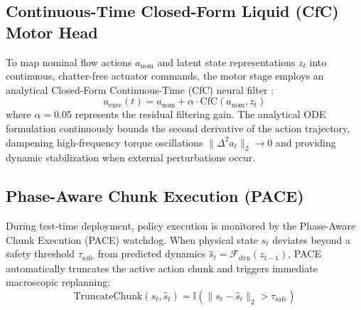 \documentclass{article}
\begin{document}
\subsection{Continuous-Time Closed-Form Liquid (CfC) Motor Head}
To map nominal flow actions $a_{\text{nom}}$ and latent state representations $z_t$ into continuous, chatter-free actuator commands, the motor stage employs an analytical Closed-Form Continuous-Time (CfC) neural filter \cite{hasani2022closed}:
\begin{equation}
    a_{\text{exec}}(t) = a_{\text{nom}} + \alpha \cdot \text{CfC}(a_{\text{nom}}, z_t)
\end{equation}
where $\alpha = 0.05$ represents the residual filtering gain. The analytical ODE formulation continuously bounds the second derivative of the action trajectory, dampening high-frequency torque oscillations $\|\Delta^2 a_t\|_2 \to 0$ and providing dynamic stabilization when external perturbations occur.

\subsection{Phase-Aware Chunk Execution (PACE)}
During test-time deployment, policy execution is monitored by the Phase-Aware Chunk Execution (PACE) watchdog. When physical state $s_t$ deviates beyond a safety threshold $\tau_{\text{safe}}$ from predicted dynamics $\hat{s}_t = \mathcal{F}_{\text{dyn}}(z_{t-1})$, PACE automatically truncates the active action chunk and triggers immediate macroscopic replanning:
\begin{equation}
    \text{TruncateChunk}(s_t, \hat{s}_t) = \mathbb{I}\left( \|s_t - \hat{s}_t\|_2 > \tau_{\text{safe}} \right)
\end{equation}
\end{document}
